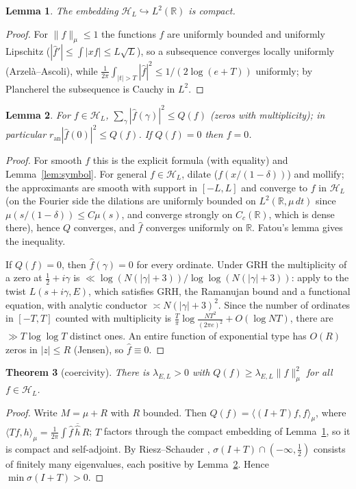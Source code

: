 \documentclass[11pt]{amsart}
\newtheorem{theorem}{Theorem}
\newtheorem{lemma}[theorem]{Lemma}
\theoremstyle{definition}
\theoremstyle{remark}
\newcommand{\R}{\mathbb{R}}
\newcommand{\ran}{r_{\mathrm{an}}}
\newcommand{\Hs}{\mathcal{H}_L}
\begin{document}
\begin{lemma}\label{lem:compact}
The embedding $\Hs\hookrightarrow L^2(\R)$ is compact.
\end{lemma}
\begin{proof}
For $\|f\|_\mu\le1$ the functions $\hat f$ are uniformly bounded and uniformly Lipschitz ($|\hat f'|\le\int|xf|\le L\sqrt L$),
so a subsequence converges locally uniformly (Arzel\`a--Ascoli), while
$\frac1{2\pi}\int_{|t|>T}|\hat f|^2\le1/(2\log(e+T))$ uniformly; by Plancherel the subsequence is Cauchy in $L^2$.
\end{proof}

\begin{lemma}\label{lem:formula}
For $f\in\Hs$, $\sum_\gamma|\hat f(\gamma)|^2\le Q(f)$ (zeros with multiplicity); in particular $\ran|\hat f(0)|^2\le Q(f)$.
If $Q(f)=0$ then $f=0$.
\end{lemma}
\begin{proof}
For smooth $f$ this is the explicit formula (with equality) and Lemma~\ref{lem:symbol}. For general $f\in\Hs$, dilate
($f(x/(1-\delta))$) and mollify; the approximants are smooth with support in $[-L,L]$ and converge to $f$ in $\Hs$ (on the Fourier side the
dilations are uniformly bounded on $L^2(\R,\mu\,dt)$ since $\mu(s/(1-\delta))\le C\mu(s)$, and converge strongly on
$C_c(\R)$, which is dense there), hence
$Q$ converges, and $\hat f$ converges uniformly on $\R$. Fatou's lemma gives the inequality.

If $Q(f)=0$, then $\hat f(\gamma)=0$ for every ordinate. Under GRH the multiplicity of a zero at $\tfrac12+i\gamma$ is
$\ll\log(N(|\gamma|+3))/\log\log(N(|\gamma|+3))$: apply \cite[Thm.~5]{CCM} to the twist $L(s+i\gamma,E)$, which satisfies
GRH, the Ramanujan bound and a functional equation, with analytic conductor $\asymp N(|\gamma|+3)^2$. Since the number of
ordinates in $[-T,T]$ counted with multiplicity is $\frac T\pi\log\frac{NT^2}{(2\pi e)^2}+O(\log NT)$, there are
$\gg T\log\log T$ distinct ones. An entire function of exponential type has $O(R)$ zeros in $|z|\le R$ (Jensen), so
$\hat f\equiv0$.
\end{proof}

\begin{theorem}[coercivity]\label{thm:coercive}
There is $\lambda_{E,L}>0$ with $Q(f)\ge\lambda_{E,L}\|f\|_\mu^2$ for all $f\in\Hs$.
\end{theorem}
\begin{proof}
Write $M=\mu+R$ with $R$ bounded. Then $Q(f)=\langle(I+T)f,f\rangle_\mu$, where $\langle Tf,h\rangle_\mu=\frac1{2\pi}\int\hat f\,
\overline{\hat h}\,R$; $T$ factors through the compact embedding of Lemma~\ref{lem:compact}, so it is compact and
self-adjoint. By Riesz--Schauder \cite[Thm.~VI.15]{RS}, $\sigma(I+T)\cap(-\infty,\tfrac12)$ consists of finitely many
eigenvalues, each positive by Lemma~\ref{lem:formula}. Hence $\min\sigma(I+T)>0$.
\end{proof}
\end{document}
